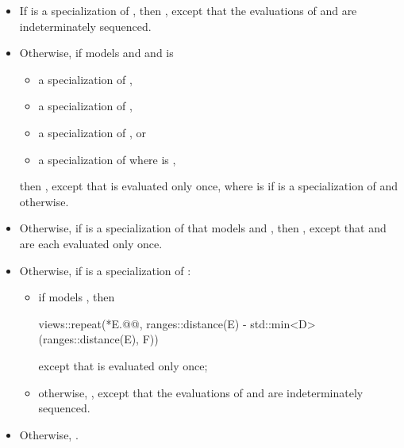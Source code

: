 \begin{itemize}
\item
If  is a specialization of
,
then ,
except that the evaluations of  and 
are indeterminately sequenced.

\item
Otherwise, if  models
 and 
and is
\begin{itemize}
\item a specialization of ,
\item a specialization of ,
\item a specialization of , or
\item a specialization of 
where  is ,
\end{itemize}
then ,
except that  is evaluated only once,
where  is 
if  is a specialization of  and  otherwise.

\item
Otherwise,
if  is
a specialization of 
that models  and ,
then
,
except that  and  are each evaluated only once.

\item
Otherwise, if  is
a specialization of :
\begin{itemize}
\item
if  models ,
then
\begin{codeblock}
views::repeat(*E.@@, ranges::distance(E) - std::min<D>(ranges::distance(E), F))
\end{codeblock}
except that  is evaluated only once;
\item
otherwise, ,
except that the evaluations of  and  are indeterminately sequenced.
\end{itemize}

\item
Otherwise, .
\end{itemize}

